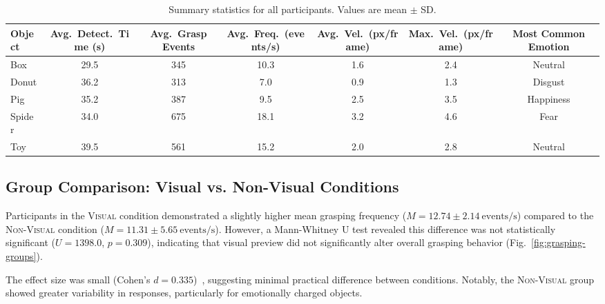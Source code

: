 \documentclass[conference]{IEEEtran}
\begin{document}
\begin{table}[H]
\caption{Summary statistics for all participants. Values are mean $\pm$ SD.}
\label{tab:summary}
\centering
\footnotesize
\setlength{\tabcolsep}{3pt}
\begin{adjustbox}{max width=\columnwidth}
\begin{tabular}{lcccccc}
\toprule
\textbf{Object} &
\textbf{Avg.\ Detect.\ Time (s)} &
\textbf{Avg.\ Grasp Events} &
\textbf{Avg.\ Freq.\ (events/s)} &
\textbf{Avg.\ Vel.\ (px/frame)} &
\textbf{Max.\ Vel.\ (px/frame)} &
\textbf{Most Common Emotion} \\ \midrule
Box    & 29.5 & 345 & 10.3 & 1.6 & 2.4 & Neutral   \\
Donut  & 36.2 & 313 &  7.0 & 0.9 & 1.3 & Disgust   \\
Pig    & 35.2 & 387 &  9.5 & 2.5 & 3.5 & Happiness \\
Spider & 34.0 & 675 & 18.1 & 3.2 & 4.6 & Fear      \\
Toy    & 39.5 & 561 & 15.2 & 2.0 & 2.8 & Neutral   \\ \bottomrule
\end{tabular}
\end{adjustbox}
\end{table}

\subsection{Group Comparison: Visual vs. Non-Visual Conditions}

Participants in the \textsc{Visual} condition demonstrated a slightly higher mean 
grasping frequency ($M = 12.74 \pm 2.14\ \text{events/s}$) compared to 
the \textsc{Non-Visual} condition ($M = 11.31 \pm 5.65\ \text{events/s}$). 
However, a Mann-Whitney U test revealed this difference was not statistically 
significant ($U = 1398.0$, $p = 0.309$), indicating that visual preview did 
not significantly alter overall grasping behavior (Fig.~\ref{fig:grasping-groups}).

The effect size was small (Cohen's $d = 0.335$)~\cite{cohen1988}, suggesting minimal practical 
difference between conditions. Notably, the \textsc{Non-Visual} group showed 
greater variability in responses, particularly for emotionally charged objects.
\end{document}
